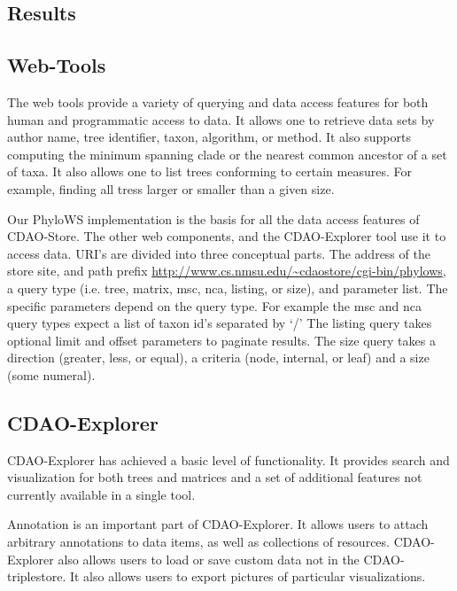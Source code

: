 \documentclass[10pt]{bmc_article}
\newenvironment{bmcformat}{\begin{raggedright}\baselineskip20pt\sloppy\setboolean{publ}{false}}{\end{raggedright}\baselineskip20pt\sloppy}
\begin{document}
\begin{bmcformat}
 
\section*{Results}
  \subsection*{Web-Tools}
  The web tools provide a variety of querying and data access features for both human and programmatic access to
  data. It allows one to retrieve data sets by author name, tree identifier, taxon, algorithm, or method. It also
  supports computing the minimum spanning clade or the nearest common ancestor of a set of taxa. It also
  allows one to  list trees conforming to certain measures. For example, finding all tress larger or smaller than
  a given size. 

   Our PhyloWS implementation is the basis for all the data access features of CDAO-Store. The other web components,
   and the CDAO-Explorer tool use it to access data. URI's are divided into three conceptual parts. The address
   of the store site, and path prefix \url{http://www.cs.nmsu.edu/~cdaostore/cgi-bin/phylows}, a query type (i.e.
   tree, matrix, msc, nca, listing, or size), and parameter list. The specific parameters depend on the query
   type. For example the msc and nca query types expect a list of taxon id's separated by `/' The listing query
   takes optional limit and offset parameters to paginate results. The size query takes a direction 
   (greater, less, or equal),  a criteria (node, internal, or leaf) and a size (some numeral).

  
  \subsection*{CDAO-Explorer}
  CDAO-Explorer has achieved a basic level of functionality. It provides search and visualization for both
  trees and matrices and a set of additional features not currently available in a single tool. 
  
  Annotation is an important part of CDAO-Explorer. It allows users to attach arbitrary annotations to data items,
  as well as collections of resources.  CDAO-Explorer also allows users to load or save custom data not in the CDAO-triplestore. It also allows users to export
  pictures of particular visualizations. 


\end{bmcformat}
\end{document}
